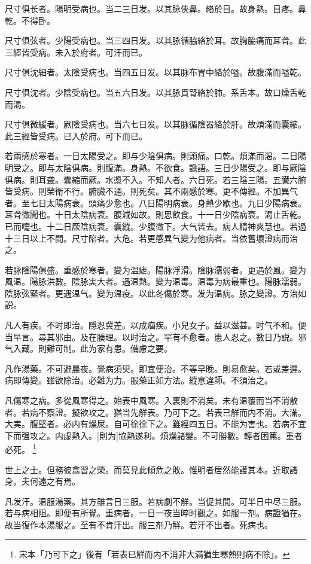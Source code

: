 \documentclass[12pt,oneside,UTF8,b5paper]{ctexbook}她她她她她她她
\begin{document}
尺寸俱长者。陽明受病也。当二三日发。以其脉俠鼻。絡於目。故身熱。目疼。鼻乾。不得卧。

尺寸俱弦者。少陽受病也。当三四日发。以其脉循脇絡於耳。故胸脇痛而耳聋。此三經皆受病。未入於府者。可汗而已。

尺寸俱沈細者。太陰受病也。当四五日发。以其脉布胃中絡於嗌。故腹滿而嗌乾。

尺寸俱沈者。少陰受病也。当五六日发。以其脉貫腎絡於肺。系舌本。故口燥舌乾而渴。

尺寸俱微緩者。厥陰受病也。当六七日发。以其脉循陰器絡於肝。故煩滿而囊縮。此三經皆受病。已入於府。可下而已。

若兩感於寒者。一日太陽受之。即与少陰俱病。則頭痛。口乾。煩滿而渴。二日陽明受之。即与太陰俱病。則腹滿。身熱。不欲食。譫語。三日少陽受之。即与厥陰俱病。則耳聋。囊縮而厥。水漿不入。不知人者。六日死。若三陰三陽。五臓六腑皆受病。則榮衛不行。腑臓不通。則死矣。其不兩感於寒。更不傳經。不加異气者。至七日太陽病衰。頭痛少愈也。八日陽明病衰。身熱少歇也。九日少陽病衰。耳聋微聞也。十日太陰病衰。腹減如故。則思飲食。十一日少陰病衰。渴止舌乾。已而嚏也。十二日厥陰病衰。囊縱。少腹微下。大气皆去。病人精神爽慧也。若過十三日以上不間。尺寸陷者。大危。若更感異气變为他病者。当依舊壞證病而治之。

若脉陰陽俱盛。重感於寒者。變为温瘧。陽脉浮滑。陰脉濡弱者。更遇於風。變为風温。陽脉洪數。陰脉実大者。遇温熱。變为温毒。温毒为病最重也。陽脉濡弱。陰脉弦緊者。更遇温气。變为温疫。以此冬傷於寒。发为温病。脉之變證。方治如説。

凡人有疾。不时即治。隱忍冀差。以成痼疾。小兒女子。益以滋甚。时气不和。便当早言。尋其邪由。及在腠理。以时治之。罕有不愈者。患人忍之。數日乃説。邪气入藏。則難可制。此为家有患。備慮之要。

凡作湯藥。不可避晨夜。覺病須臾。即宜便治。不等早晚。則易愈矣。若或差遲。病即傳變。雖欲除治。必難为力。服藥正如方法。縱意違師。不須治之。

凡傷寒之病。多從風寒得之。始表中風寒。入裏則不消矣。未有温覆而当不消散者。若病不察證。擬欲攻之。猶当先觧表。乃可下之。若表已觧而内不消。大滿。大実。腹堅者。必内有燥屎。自可徐徐下之。雖經四五日。不能为害也。若病不宜下而强攻之。内虚熱入。[則为]協熱遂利。煩燥諸變。不可勝數。輕者困篤。重者必死。
	\footnote{宋本「乃可下之」後有「若表已觧而内不消非大滿猶生寒熱則病不除」。}

世上之士。但務彼翕習之榮。而莫見此傾危之敗。惟明者居然能護其本。近取諸身。夫何遠之有焉。

凡发汗。温服湯藥。其方雖言日三服。若病劇不觧。当促其間。可半日中尽三服。若与病相阻。即便有所覺。重病者。一日一夜当晬时觀之。如服一剂。病證猶在。故当復作本湯服之。至有不肯汗出。服三剂乃觧。若汗不出者。死病也。
\end{document}
